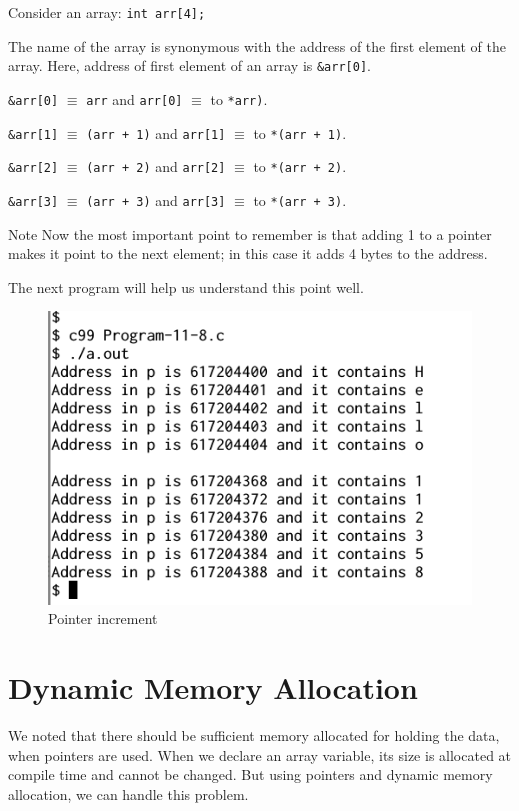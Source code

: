 \documentclass[11pt,a4paper]{article}
\begin{document}
Consider an array: \lstinline!int arr[4];!

The name of the array is synonymous with the address of the first element of the array. Here, address of first element of an array is \texttt{\&arr[0]}. 

\texttt{\&arr[0]} $\equiv$ \texttt{arr} and \texttt{arr[0]} $\equiv$ to \texttt{*arr)}.

\texttt{\&arr[1]} $\equiv$ \texttt{(arr + 1)} and \texttt{arr[1]} $\equiv$ to \texttt{*(arr + 1)}.

\texttt{\&arr[2]} $\equiv$ \texttt{(arr + 2)} and \texttt{arr[2]} $\equiv$ to \texttt{*(arr + 2)}.

\texttt{\&arr[3]} $\equiv$ \texttt{(arr + 3)} and \texttt{arr[3]} $\equiv$ to \texttt{*(arr + 3)}.


\begin{bclogo}[couleur=blue!5, arrondi=0.3, logo=\bcattention]{Note}
Now the most important point to remember is that adding 1 to a pointer makes it point to the next element; in this case it adds 4 bytes to the address.
\end{bclogo}

The next program will help us understand this point well.



\begin{figure}[ht]
\begin{center}
\includegraphics[scale=0.6]{Output-11-8.png}
\caption{Pointer increment}
\label{output-11-8}
\end{center}
\end{figure}

\section*{Dynamic Memory Allocation}
We noted that there should be sufficient memory allocated for holding the data, when pointers are used. When we declare an array variable, its size is allocated at compile time and cannot be changed. But using pointers and dynamic memory allocation, we can handle this problem.
\end{document}
